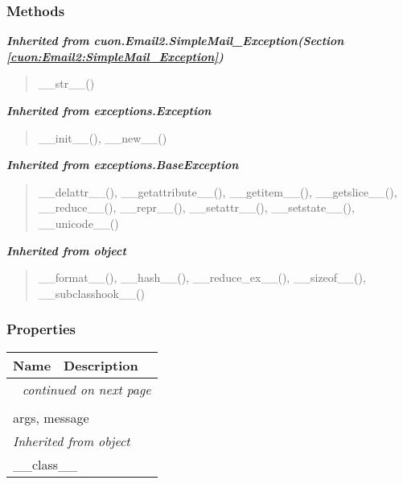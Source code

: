   \subsubsection{Methods}


\large{\textbf{\textit{Inherited from cuon.Email2.SimpleMail\_Exception\textit{(Section \ref{cuon:Email2:SimpleMail_Exception})}}}}

\begin{quote}
\_\_str\_\_()
\end{quote}

\large{\textbf{\textit{Inherited from exceptions.Exception}}}

\begin{quote}
\_\_init\_\_(), \_\_new\_\_()
\end{quote}

\large{\textbf{\textit{Inherited from exceptions.BaseException}}}

\begin{quote}
\_\_delattr\_\_(), \_\_getattribute\_\_(), \_\_getitem\_\_(), \_\_getslice\_\_(), \_\_reduce\_\_(), \_\_repr\_\_(), \_\_setattr\_\_(), \_\_setstate\_\_(), \_\_unicode\_\_()
\end{quote}

\large{\textbf{\textit{Inherited from object}}}

\begin{quote}
\_\_format\_\_(), \_\_hash\_\_(), \_\_reduce\_ex\_\_(), \_\_sizeof\_\_(), \_\_subclasshook\_\_()
\end{quote}


  \subsubsection{Properties}

    \vspace{-1cm}
\hspace{\varindent}\begin{longtable}{|p{\varnamewidth}|p{\vardescrwidth}|l}
\cline{1-2}
\cline{1-2} \centering \textbf{Name} & \centering \textbf{Description}& \\
\cline{1-2}
\endhead\cline{1-2}\multicolumn{3}{r}{\small\textit{continued on next page}}\\\endfoot\cline{1-2}
\endlastfoot\multicolumn{2}{|l|}{\textit{Inherited from exceptions.BaseException}}\\
\multicolumn{2}{|p{\varwidth}|}{\raggedright args, message}\\
\cline{1-2}
\multicolumn{2}{|l|}{\textit{Inherited from object}}\\
\multicolumn{2}{|p{\varwidth}|}{\raggedright \_\_class\_\_}\\
\cline{1-2}
\end{longtable}

